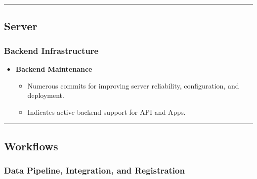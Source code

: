 \documentclass[
  letterpaper,
  DIV=11,
  numbers=noendperiod]{scrreprt}
\providecommand{\tightlist}{%
  \setlength{\itemsep}{0pt}\setlength{\parskip}{0pt}}
\begin{document}
\begin{center}\rule{0.5\linewidth}{0.5pt}\end{center}

\subsection{Server}\label{server}

\subsubsection{Backend Infrastructure}\label{backend-infrastructure}

\begin{itemize}
\tightlist
\item
  \textbf{Backend Maintenance}

  \begin{itemize}
  \tightlist
  \item
    Numerous commits for improving server reliability, configuration,
    and deployment.
  \item
    Indicates active backend support for API and Apps.
  \end{itemize}
\end{itemize}

\begin{center}\rule{0.5\linewidth}{0.5pt}\end{center}

\subsection{Workflows}\label{workflows}

\subsubsection{Data Pipeline, Integration, and
Registration}\label{data-pipeline-integration-and-registration}
\end{document}
